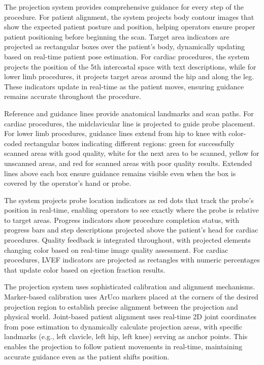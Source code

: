 \documentclass[12pt,a4paper]{article}
\begin{document}
The projection system provides comprehensive guidance for every step of the procedure. For patient alignment, the system projects body contour images that show the expected patient posture and position, helping operators ensure proper patient positioning before beginning the scan. Target area indicators are projected as rectangular boxes over the patient's body, dynamically updating based on real-time patient pose estimation. For cardiac procedures, the system projects the position of the 5th intercostal space with text descriptions, while for lower limb procedures, it projects target areas around the hip and along the leg. These indicators update in real-time as the patient moves, ensuring guidance remains accurate throughout the procedure.

Reference and guidance lines provide anatomical landmarks and scan paths. For cardiac procedures, the midclavicular line is projected to guide probe placement. For lower limb procedures, guidance lines extend from hip to knee with color-coded rectangular boxes indicating different regions: green for successfully scanned areas with good quality, white for the next area to be scanned, yellow for unscanned areas, and red for scanned areas with poor quality results. Extended lines above each box ensure guidance remains visible even when the box is covered by the operator's hand or probe.

The system projects probe location indicators as red dots that track the probe's position in real-time, enabling operators to see exactly where the probe is relative to target areas. Progress indicators show procedure completion status, with progress bars and step descriptions projected above the patient's head for cardiac procedures. Quality feedback is integrated throughout, with projected elements changing color based on real-time image quality assessment. For cardiac procedures, LVEF indicators are projected as rectangles with numeric percentages that update color based on ejection fraction results.

The projection system uses sophisticated calibration and alignment mechanisms. Marker-based calibration uses ArUco markers placed at the corners of the desired projection region to establish precise alignment between the projection and physical world. Joint-based patient alignment uses real-time 2D joint coordinates from pose estimation to dynamically calculate projection areas, with specific landmarks (e.g., left clavicle, left hip, left knee) serving as anchor points. This enables the projection to follow patient movements in real-time, maintaining accurate guidance even as the patient shifts position.
\end{document}
